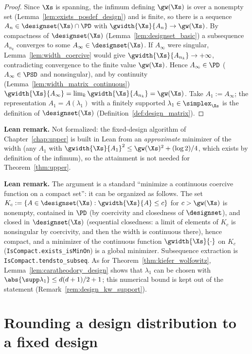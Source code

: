 \begin{proof}
Since $\Xs$ is spanning, the infimum defining $\gw(\Xs)$ is over a nonempty set (Lemma~\ref{lem:exists_posdef_design})
and is finite, so there is a sequence $A_n \in \designset(\Xs)\cap\PD$ with
$\gwidth{\Xs}{A_n} \to \gw(\Xs)$. By compactness of $\designset(\Xs)$
(Lemma~\ref{lem:designset_basic}) a subsequence $A_{n_k}$ converges to some
$A_\infty \in \designset(\Xs)$. If $A_\infty$ were singular, Lemma~\ref{lem:width_coercive}
would give $\gwidth{\Xs}{A_{n_k}} \to +\infty$, contradicting convergence to the finite value
$\gw(\Xs)$. Hence $A_\infty \in \PD$ ($A_\infty \in \PSD$ and nonsingular), and by continuity
(Lemma~\ref{lem:width_matrix_continuous}) $\gwidth{\Xs}{A_\infty} = \lim_k\gwidth{\Xs}{A_{n_k}} =
\gw(\Xs)$. Take $A_1 := A_\infty$; the representation $A_1 = A(\lambda_1)$ with a finitely
supported $\lambda_1 \in \simplex_{\Xs}$ is the definition of $\designset(\Xs)$
(Definition~\ref{def:design_matrix}).
\end{proof}

\textbf{Lean remark.} Not formalized: the fixed-design algorithm of Chapter~\ref{chap:upper} is
built in Lean from an \emph{approximate} minimizer of the width (any $A_1$ with
$\gwidth{\Xs}{A_1}^2 \le \gw(\Xs)^2 + (\log 2)/4$, which exists by definition of the infimum),
so the attainment is not needed for Theorem~\ref{thm:upper}.

\textbf{Lean remark.} The argument is a standard ``minimize a continuous coercive function on a
compact set'': it can be organized as follows. The set $K_c := \{A \in \designset(\Xs) :
\gwidth{\Xs}{A} \le c\}$ for $c > \gw(\Xs)$ is nonempty, contained in $\PD$ (by coercivity and
closedness of $\designset$), and closed in $\designset(\Xs)$ (sequential closedness: a limit of
elements of $K_c$ is nonsingular by coercivity, and then the width is continuous there), hence
compact, and a minimizer of the continuous function $\gwidth{\Xs}{\cdot}$ on $K_c$
(\texttt{IsCompact.exists\_isMinOn}) is a global minimizer. Subsequence extraction is
\texttt{IsCompact.tendsto\_subseq}. As for Theorem~\ref{thm:kiefer_wolfowitz},
Lemma~\ref{lem:caratheodory_design} shows that $\lambda_1$ can be chosen with
$\abs{\supp\lambda_1} \le d(d+1)/2+1$; this numerical bound is kept out of the statement
(Remark~\ref{rem:design_kw_support}).

\section{Rounding a design distribution to a fixed design}
\label{sec:rounding}

